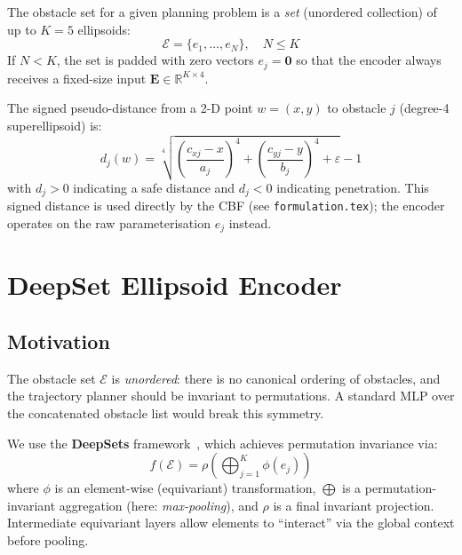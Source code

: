 \documentclass{article}
\newcommand{\R}{\mathbb{R}}
\begin{document}
The obstacle set for a given planning problem is a \emph{set} (unordered collection)
of up to $K=5$ ellipsoids:
\begin{equation}
    \mathcal{E} = \{e_1, \dots, e_N\}, \quad N \leq K
\end{equation}
If $N < K$, the set is padded with zero vectors $e_j = \mathbf{0}$ so that the
encoder always receives a fixed-size input $\mathbf{E} \in \R^{K \times 4}$.

The signed pseudo-distance from a 2-D point $w = (x, y)$ to obstacle $j$
(degree-4 superellipsoid) is:
\begin{equation}
    d_j(w) = \sqrt[4]{\left(\frac{c_{xj} - x}{a_j}\right)^4 +
                       \left(\frac{c_{yj} - y}{b_j}\right)^4 + \varepsilon} - 1
\end{equation}
with $d_j > 0$ indicating a safe distance and $d_j < 0$ indicating penetration.
This signed distance is used directly by the CBF (see \texttt{formulation.tex});
the encoder operates on the raw parameterisation $e_j$ instead.

\section{DeepSet Ellipsoid Encoder}

\subsection{Motivation}

The obstacle set $\mathcal{E}$ is \emph{unordered}: there is no canonical ordering
of obstacles, and the trajectory planner should be invariant to permutations.
A standard MLP over the concatenated obstacle list would break this symmetry.

We use the \textbf{DeepSets} framework~\cite{zaheer2017deep}, which achieves
permutation invariance via:
\begin{equation}
    f(\mathcal{E}) = \rho\!\left(\bigoplus_{j=1}^{K} \phi(e_j)\right)
\end{equation}
where $\phi$ is an element-wise (equivariant) transformation, $\bigoplus$ is a
permutation-invariant aggregation (here: \emph{max-pooling}), and $\rho$ is a
final invariant projection. Intermediate equivariant layers allow elements to
``interact'' via the global context before pooling.
\end{document}
